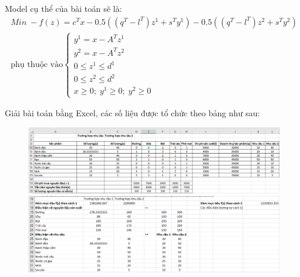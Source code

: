 \documentclass[a4paper]{article}
\begin{document}
        Model cụ thể của bài toán sẽ là:
        \begin{gather*}
            Min \; -f(z) = c^Tx - 0.5((q^T - l^T)z^1+s^Ty^1) - 0.5((q^T - l^T)z^2+s^Ty^2)\\
            \text{phụ thuộc vào}
            \begin{cases}
                y^1 = x - A^Tz^1\\
                y^2 = x - A^Tz^2\\
                0 \leq z^1 \leq d^1\\
                0 \leq z^2 \leq d^2\\
                x \geq 0; \; y^1 \geq 0; \; y^2 \geq 0
            \end{cases}
        \end{gather*}

        Giải bài toán bằng Excel, các số liệu được tổ chức theo bảng như sau:
        \begin{figure}[!ht]
            \centering
            \includegraphics[width=1\linewidth]{tab2.png}
            \includegraphics[width=1\linewidth]{tab3.png}
        \end{figure}
\end{document}
